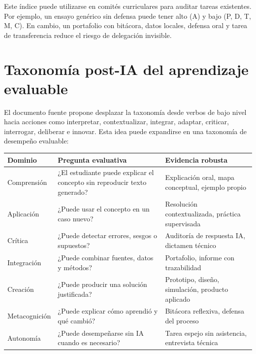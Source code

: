 \documentclass[
  spanish,
  letterpaper,
  DIV=11,
  numbers=noendperiod]{scrartcl}
\begin{document}
Este índice puede utilizarse en comités curriculares para auditar tareas
existentes. Por ejemplo, un ensayo genérico sin defensa puede tener alto
(A) y bajo (P, D, T, M, C). En cambio, un portafolio con bitácora, datos
locales, defensa oral y tarea de transferencia reduce el riesgo de
delegación invisible.

\section{Taxonomía post-IA del aprendizaje
evaluable}\label{taxonomuxeda-post-ia-del-aprendizaje-evaluable}

El documento fuente propone desplazar la taxonomía desde verbos de bajo
nivel hacia acciones como interpretar, contextualizar, integrar,
adaptar, criticar, interrogar, deliberar e innovar. Esta idea puede
expandirse en una taxonomía de desempeño evaluable:

\begin{longtable}[]{@{}
  >{\raggedright\arraybackslash}p{}
  >{\raggedright\arraybackslash}p{}
  >{\raggedright\arraybackslash}p{}@{}}
\toprule\noalign{}
\begin{minipage}[b]{\linewidth}\raggedright
Dominio
\end{minipage} & \begin{minipage}[b]{\linewidth}\raggedright
Pregunta evaluativa
\end{minipage} & \begin{minipage}[b]{\linewidth}\raggedright
Evidencia robusta
\end{minipage} \\
\midrule\noalign{}
\endhead
\bottomrule\noalign{}
\endlastfoot
Comprensión & ¿El estudiante puede explicar el concepto sin reproducir
texto generado? & Explicación oral, mapa conceptual, ejemplo propio \\
Aplicación & ¿Puede usar el concepto en un caso nuevo? & Resolución
contextualizada, práctica supervisada \\
Crítica & ¿Puede detectar errores, sesgos o supuestos? & Auditoría de
respuesta IA, dictamen técnico \\
Integración & ¿Puede combinar fuentes, datos y métodos? & Portafolio,
informe con trazabilidad \\
Creación & ¿Puede producir una solución justificada? & Prototipo,
diseño, simulación, producto aplicado \\
Metacognición & ¿Puede explicar cómo aprendió y qué cambió? & Bitácora
reflexiva, defensa del proceso \\
Autonomía & ¿Puede desempeñarse sin IA cuando es necesario? & Tarea
espejo sin asistencia, entrevista técnica \\
\end{longtable}
\end{document}
